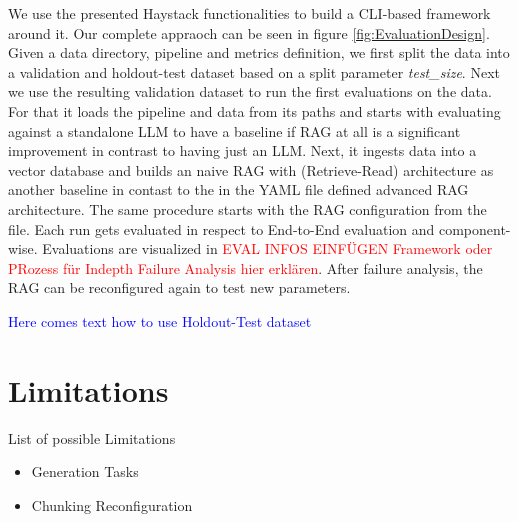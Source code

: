 We use the presented Haystack functionalities to build a CLI-based framework around it. Our complete appraoch can be seen in figure \ref{fig:EvaluationDesign}. Given a data directory, pipeline and metrics definition, we first split the data into a validation and holdout-test dataset based on a split parameter \textit{test\_size}. Next we use the resulting validation dataset to run the first evaluations on the data. For that it loads the pipeline and data from its paths and starts with evaluating against a standalone LLM to have a baseline if RAG at all is a significant improvement in contrast to having just an LLM. Next, it ingests data into a vector database and builds an naive RAG with (Retrieve-Read) architecture as another baseline in contast to the in the YAML file defined advanced RAG architecture. The same procedure starts with the RAG configuration from the file. Each run gets evaluated in respect to End-to-End evaluation and component-wise. Evaluations are visualized in \textcolor{red}{EVAL INFOS EINFÜGEN Framework oder PRozess für Indepth Failure Analysis hier erklären}. After failure analysis, the RAG can be reconfigured again to test new parameters. 

\textcolor{blue}{Here comes text how to use Holdout-Test dataset}



\section{Limitations}

List of possible Limitations

\begin{itemize}
    \item Generation Tasks 
    \item Chunking Reconfiguration
\end{itemize}




